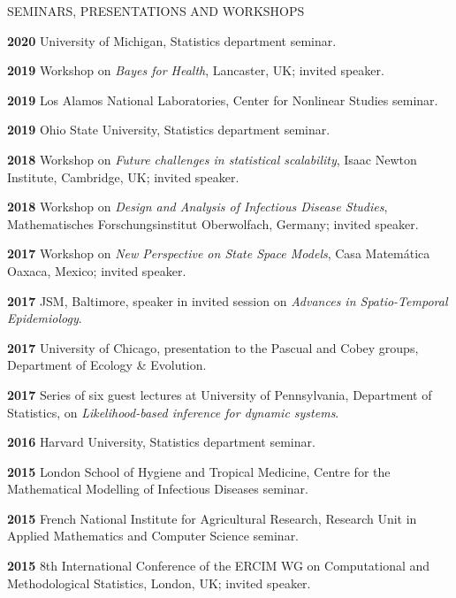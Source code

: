 \begin{mylist}{SEMINARS, PRESENTATIONS AND WORKSHOPS}
\item{\bf 2020 } University of Michigan, Statistics department seminar.

\item{\bf 2019 } Workshop on {\it Bayes for Health}, Lancaster, UK; invited speaker.

  \item{\bf 2019 } Los Alamos National Laboratories, Center for Nonlinear Studies seminar.
  
  \item{\bf 2019 } Ohio State University, Statistics department seminar.
  
\item{\bf 2018 } Workshop on {\it Future challenges in statistical scalability}, Isaac Newton Institute, Cambridge, UK; invited speaker.

\item{\bf 2018 }  Workshop on {\it Design and Analysis of Infectious Disease Studies}, Mathematisches Forschungsinstitut Oberwolfach, Germany; invited speaker.

\item{\bf 2017 } Workshop on {\it New Perspective on State Space Models}, Casa Matem\'{a}tica Oaxaca, Mexico; invited speaker.

\item{\bf 2017 } JSM, Baltimore, speaker in invited session on {\it Advances in Spatio-Temporal Epidemiology}.

\item{\bf 2017 } University of Chicago, presentation to the Pascual and Cobey groups, Department of Ecology \& Evolution.

\item{\bf 2017 } Series of six guest lectures at University of Pennsylvania, Department of Statistics, on {\it Likelihood-based inference for dynamic systems}.

\item{\bf 2016 } Harvard University, Statistics department seminar.

\item{\bf 2015 } London School of Hygiene and Tropical Medicine, Centre for the Mathematical Modelling of Infectious Diseases seminar.

\item{\bf 2015 } French National Institute for Agricultural Research, Research Unit in Applied Mathematics and Computer Science seminar.

\item{\bf 2015 } 8th International Conference of the ERCIM WG on Computational and Methodological Statistics, London, UK; invited speaker.


\end{mylist}
